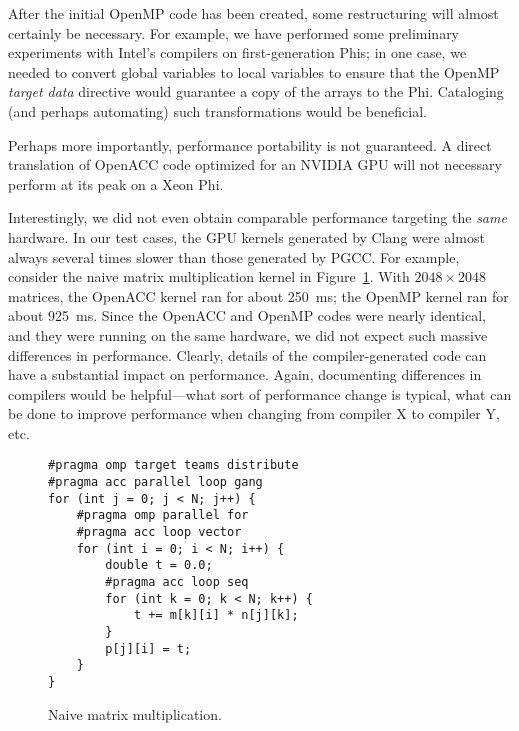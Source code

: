 \documentclass{sig-alternate-05-2015}
\begin{document}
After the initial OpenMP code has been created, some restructuring will almost
certainly be necessary.  For example, we have performed some preliminary
experiments with Intel's compilers on first-generation Phis; in one case, we
needed to convert global variables to local variables to ensure that the OpenMP
\emph{target data} directive would guarantee a copy of the arrays to the Phi.
Cataloging (and perhaps automating) such transformations would be beneficial.

Perhaps more importantly, performance portability is not guaranteed.  A direct
translation of OpenACC code optimized for an NVIDIA GPU will not necessary
perform at its peak on a Xeon Phi.

Interestingly, we did not even obtain comparable performance targeting the
\emph{same} hardware.  In our test cases, the GPU kernels generated by Clang
were almost always several times slower than those generated by PGCC.  For
example, consider the naive matrix multiplication kernel in
Figure~\ref{fig:matmul}.  With $2048 \times 2048$ matrices, the OpenACC kernel
ran for about 250~ms; the OpenMP kernel ran for about 925~ms.  Since the
OpenACC and OpenMP codes were nearly identical, and they were running on the
same hardware, we did not expect such massive differences in performance.
Clearly, details of the compiler-generated code can have a substantial impact
on performance.  Again, documenting differences in compilers would be
helpful---what sort of performance change is typical, what can be done to
improve performance when changing from compiler X to compiler Y, etc.

\begin{figure}
\begin{verbatim}
#pragma omp target teams distribute
#pragma acc parallel loop gang
for (int j = 0; j < N; j++) {
    #pragma omp parallel for
    #pragma acc loop vector
    for (int i = 0; i < N; i++) {
        double t = 0.0;
        #pragma acc loop seq
        for (int k = 0; k < N; k++) {
            t += m[k][i] * n[j][k];
        }
        p[j][i] = t;
    }
}
\end{verbatim}
\caption{Naive matrix multiplication.}
\label{fig:matmul}
\end{figure}




%

%
%
\end{document}
